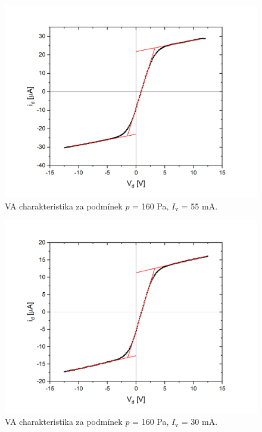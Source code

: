 \documentclass[a4paper,12pt]{article}
\begin{document}
\begin{figure}[h!]
	\centering
	\includegraphics[width=130mm]{dvojna3.png}
	\caption{VA charakteristika za podmínek $p$ = 160 \si{\pascal}, $I_\text{{v}}$ = 55 \si{\milli\ampere}.}
	\label{dvojna3}
\end{figure}

\begin{figure}[h!]
	\centering
	\includegraphics[width=130mm]{dvojna4.png}
	\caption{VA charakteristika za podmínek $p$ = 160 \si{\pascal}, $I_\text{{v}}$ = 30 \si{\milli\ampere}.}
	\label{dvojna4}
\end{figure}
\end{document}
